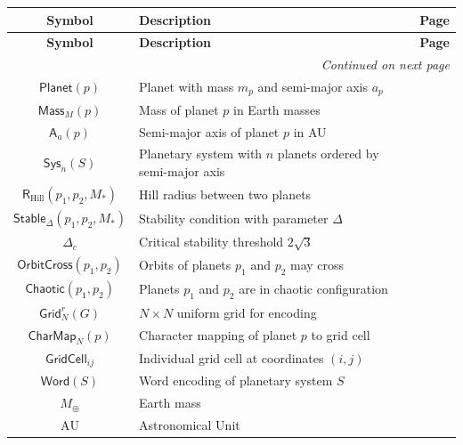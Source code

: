 \documentclass{amsart}
\newenvironment{glossarytable}{%
	\renewcommand{\arraystretch}{1.3}%
	\setlength{\tabcolsep}{4pt}%
	\begin{longtable}{|c|p{11cm}|c|}
		\hline
		\textbf{Symbol} & \textbf{Description} & \textbf{Page} \\
		\hline
		\endfirsthead
		\hline
		\textbf{Symbol} & \textbf{Description} & \textbf{Page} \\
		\hline
		\endhead
		\hline
		\multicolumn{3}{r}{\textit{Continued on next page}} \\
		\endfoot
		\hline
		\endlastfoot
}{%
	\end{longtable}%
}
\theoremstyle{break}
\begin{document}
\begin{glossarytable}
		$\mathsf{Planet}(p)$ & Planet with mass $m_p$ and semi-major axis $a_p$ & \pageref{def:planet} \\
		$\mathsf{Mass}_{M}(p)$ & Mass of planet $p$ in Earth masses & \pageref{def:mass} \\
		$\mathsf{A}_{a}(p)$ & Semi-major axis of planet $p$ in AU & \pageref{def:semi-major-axis} \\
		$\mathsf{Sys}_n(S)$ & Planetary system with $n$ planets ordered by semi-major axis & \pageref{def:system} \\
		$\mathsf{R}_{\mathrm{Hill}}(p_1, p_2, M_*)$ & Hill radius between two planets & \pageref{def:hill-radius} \\
		$\mathsf{Stable}_{\Delta}(p_1, p_2, M_*)$ & Stability condition with parameter $\Delta$ & \pageref{def:stability} \\
		$\Delta_c$ & Critical stability threshold $2\sqrt{3}$ & \pageref{def:critical-stability} \\
		$\mathsf{OrbitCross}(p_1, p_2)$ & Orbits of planets $p_1$ and $p_2$ may cross & \pageref{def:orbit-cross} \\
		$\mathsf{Chaotic}(p_1, p_2)$ & Planets $p_1$ and $p_2$ are in chaotic configuration & \pageref{def:chaotic} \\
		$\mathsf{Grid}_{N}^{r}(G)$ & $N \times N$ uniform grid for encoding & \pageref{def:encoding-grid} \\
		$\mathsf{CharMap}_{N}(p)$ & Character mapping of planet $p$ to grid cell & \pageref{def:character-map} \\
		$\mathsf{GridCell}_{ij}$ & Individual grid cell at coordinates $(i,j)$ & \pageref{def:grid-cell} \\
		$\mathsf{Word}(S)$ & Word encoding of planetary system $S$ & \pageref{def:word} \\
		
		$M_\oplus$ & Earth mass & \pageref{def:mass} \\
		$\text{AU}$ & Astronomical Unit & \pageref{def:semi-major-axis} \\
		
	\end{glossarytable}
	
	\clearpage
	\nocite{*}
	
	
	
	\clearpage
	\printindex
	
	\makeatletter
	\let\addcontentsline\orig@addcontentsline
\end{document}
